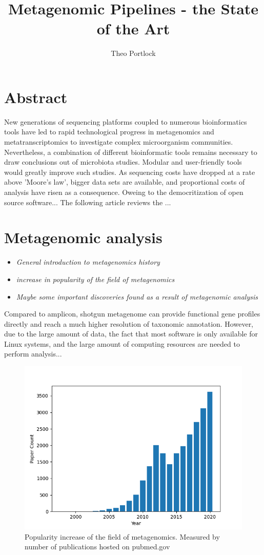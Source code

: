 \documentclass{article}
\title{Metagenomic Pipelines - the State of the Art}
\author{Theo Portlock}
\begin{document}
\maketitle

\section{Abstract}
New generations of sequencing platforms coupled to numerous bioinformatics tools have led to rapid technological progress in metagenomics and metatranscriptomics to investigate complex microorganism communities.
Nevertheless, a combination of different bioinformatic tools remains necessary to draw conclusions out of microbiota studies.
Modular and user-friendly tools would greatly improve such studies.
As sequencing costs have dropped at a rate above 'Moore's law', bigger data sets are available, and proportional costs of analysis have risen as a consequence.
Oweing to the democritization of open source software...
The following article reviews the ...


\section{Metagenomic analysis}
\begin{itemize}
	\item \emph{General introduction to metagenomics history }
	\item \emph{increase in popularity of the field of metagenomics}
	\item \emph{Maybe some important discoveries found as a result of metagenomic analysis}
\end{itemize}
Compared to amplicon, shotgun metagenome can provide functional gene profiles directly and reach a much higher resolution of taxonomic annotation.
However, due to the large amount of data, the fact that most software is only available for Linux systems, and the large amount of computing resources are needed to perform analysis...
\begin{figure}
\centering
\includegraphics[scale=0.7]{figures/popularity.png}
\caption[Popularity increase of the field of metagenomics]{
	Popularity increase of the field of metagenomics. Measured by number of publications hosted on pubmed.gov }
\label{Fpopularity}
\end{figure}
\end{document}
